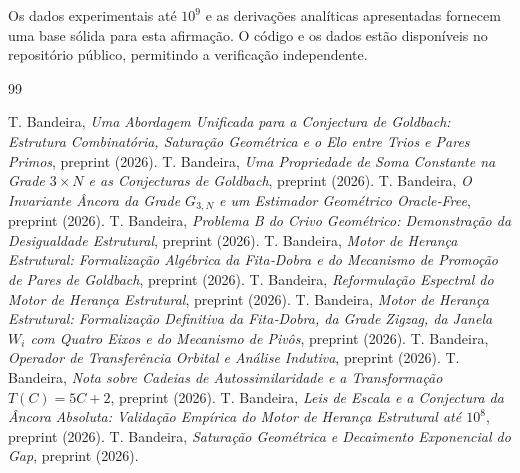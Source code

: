 \documentclass[11pt]{article}
\theoremstyle{definition}
\begin{document}
	Os dados experimentais até $10^9$ e as derivações analíticas apresentadas fornecem uma base sólida para esta afirmação. O código e os dados estão disponíveis no repositório público, permitindo a verificação independente.
	
	
	
	\begin{thebibliography}{99}
		
		 T. Bandeira, \emph{Uma Abordagem Unificada para a Conjectura de Goldbach: Estrutura Combinatória, Saturação Geométrica e o Elo entre Trios e Pares Primos}, preprint (2026).
		 T. Bandeira, \emph{Uma Propriedade de Soma Constante na Grade $3\times N$ e as Conjecturas de Goldbach}, preprint (2026).
		 T. Bandeira, \emph{O Invariante Âncora da Grade $G_{3,N}$ e um Estimador Geométrico Oracle‑Free}, preprint (2026).
		 T. Bandeira, \emph{Problema B do Crivo Geométrico: Demonstração da Desigualdade Estrutural}, preprint (2026).
		 T. Bandeira, \emph{Motor de Herança Estrutural: Formalização Algébrica da Fita‑Dobra e do Mecanismo de Promoção de Pares de Goldbach}, preprint (2026).
		 T. Bandeira, \emph{Reformulação Espectral do Motor de Herança Estrutural}, preprint (2026).
		 T. Bandeira, \emph{Motor de Herança Estrutural: Formalização Definitiva da Fita‑Dobra, da Grade Zigzag, da Janela $W_i$ com Quatro Eixos e do Mecanismo de Pivôs}, preprint (2026).
		 T. Bandeira, \emph{Operador de Transferência Orbital e Análise Indutiva}, preprint (2026).
		 T. Bandeira, \emph{Nota sobre Cadeias de Autossimilaridade e a Transformação $T(C)=5C+2$}, preprint (2026).
		 T. Bandeira, \emph{Leis de Escala e a Conjectura da Âncora Absoluta: Validação Empírica do Motor de Herança Estrutural até $10^8$}, preprint (2026).
		 T. Bandeira, \emph{Saturação Geométrica e Decaimento Exponencial do Gap}, preprint (2026).
		
	\end{thebibliography}
	
\end{document}
